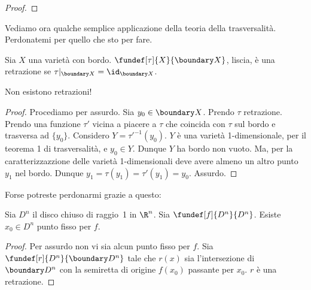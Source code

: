 \begin{description}
\begin{proof}
 \end{proof}
\end{description}

Vediamo ora qualche semplice applicazione della teoria della trasversalità.
Perdonatemi per quello che sto per fare.

\begin{defn}[Retrazione]
Sia $X$ una varietà con bordo. $\fundef[\tau]{X}{\boundary X}$, liscia, è una retrazione se $\tau|_{\boundary X}=\id_{\boundary X}$.
\end{defn}

\begin{teo}
Non esistono retrazioni!
\end{teo}
\begin{proof}
Procediamo per assurdo. Sia $y_0 \in \boundary X$. Prendo $\tau$ retrazione. Prendo una funzione $\tau'$ vicina a piacere a $\tau$ che coincida con $\tau$ sul bordo e trasversa ad $\{y_0\}$. Considero $Y=\tau'^{-1}(y_0)$. $Y$ è una varietà 1-dimensionale, per il teorema 1 di trasversalità, e $y_0\in Y$. Dunque $Y$ ha bordo non vuoto. Ma, per la caratterizzazzione delle varietà 1-dimensionali deve avere almeno un altro punto $y_1$ nel bordo. Dunque $y_1=\tau(y_1)=\tau'(y_1)=y_0$. Assurdo.  
\end{proof}
Forse potreste perdonarmi grazie a questo:
\begin{teo}
Sia $D^n$ il disco chiuso di raggio~1 in $\R^n$. Sia $\fundef[f]{D^n}{D^n}$. Esiste $x_0\in D^n$ punto fisso per $f$.
\end{teo}
\begin{proof}
Per assurdo non vi sia alcun punto fisso per $f$. Sia $\fundef[r]{D^n}{\boundary D^n}$ tale che $r(x)$ sia l'intersezione di $\boundary D^n$ con la semiretta di origine $f(x_0)$ passante per $x_0$. $r$ è una retrazione. 
\end{proof}

\begin{center}
\end{center}

